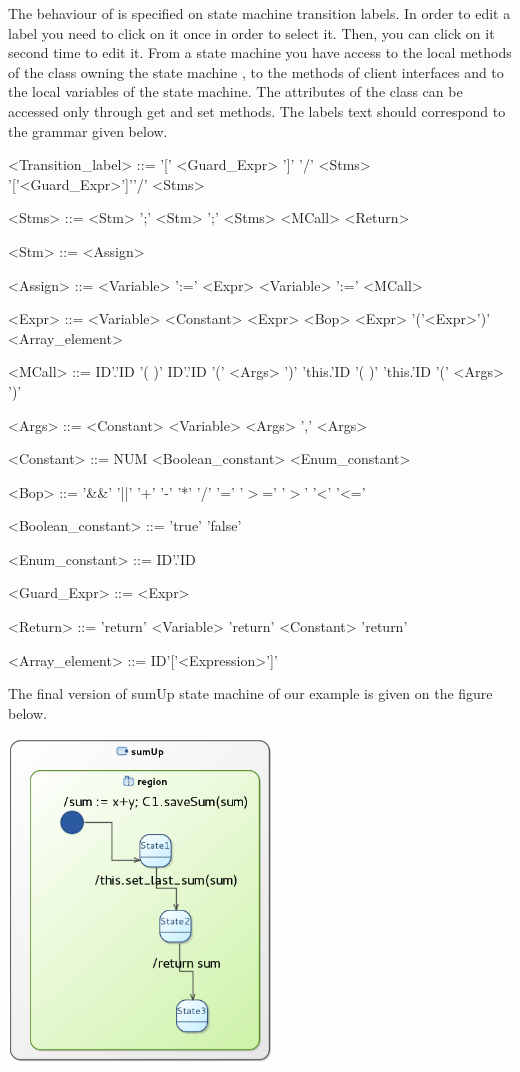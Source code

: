 \documentclass[12pt]{article}
\begin{document}
The behaviour of is specified on state machine transition labels. In order to edit a label you need to click on it once in order to select it. Then, you can click on it second time to edit it. From a state machine you have access to the local methods of the class owning the state machine , to the methods of client interfaces and to the local variables of the state machine. The attributes of the class can be accessed only through get and set methods. The labels text should correspond to the grammar given below.

\begin{grammar}

<Transition_label> ::= '[' <Guard_Expr> ']' \alt '/' <Stms> \alt  '['<Guard_Expr>']'\alt '/' <Stms>

<Stms> ::= <Stm> ';' \alt <Stm> ';' <Stms> \alt <MCall> \alt <Return>

<Stm> ::= <Assign> 

<Assign> ::= <Variable> ':='  <Expr> \alt <Variable> ':=' <MCall>

<Expr> ::=  <Variable> \alt 
			<Constant> \alt  
			<Expr> <Bop> <Expr> \alt 
			'('<Expr>')' \alt
			<Array\_element>

<MCall> ::= ID'.'ID '( )' \alt 
	 ID'.'ID '(' <Args> ')' \alt 
	 'this.'ID '( )' \alt 
	'this.'ID  '(' <Args> ')'
	 
<Args> ::=  <Constant> \alt <Variable> \alt <Args> ',' <Args>

<Constant> ::= NUM \alt <Boolean_constant> \alt <Enum_constant>

<Bop> ::=  '\&\&' \alt  '||'  \alt '+' \alt '-' \alt '*' \alt '/' \alt '=' \alt '$>$=' \alt '$>$' \alt '\textless'  \alt '\textless='

<Boolean_constant> ::= 'true' \alt 'false'

<Enum_constant> ::= ID'.'ID

<Guard_Expr> ::= <Expr>

<Return> ::= 'return' <Variable> \alt 'return' <Constant> \alt  'return'

<Array\_element> ::= ID'['<Expression>']'
\end{grammar}

The final version of sumUp state machine of our example is given on the figure below.

     \centerline{
     \includegraphics[width=7cm]{draws/sm.png}
     \label{fig:vce-proj}
     }
\end{document}
